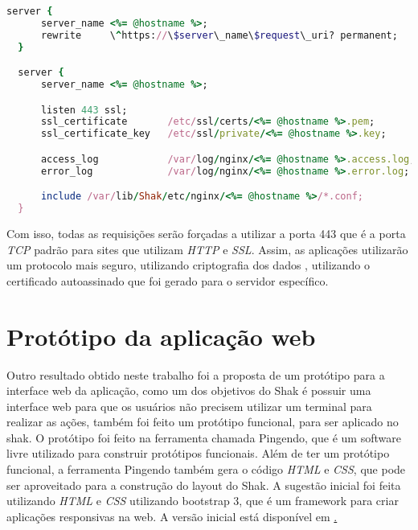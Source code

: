 \begin{lstlisting}[language=Ruby,label=dice_index,caption={Exemplo de arquivo de configuração do Nginx para aplicações web no shak}]
  server {
      server_name <%= @hostname %>;
      rewrite     \^https://\$server\_name\$request\_uri? permanent;
  }

  server {
      server_name <%= @hostname %>;

      listen 443 ssl;
      ssl_certificate       /etc/ssl/certs/<%= @hostname %>.pem;
      ssl_certificate_key   /etc/ssl/private/<%= @hostname %>.key;

      access_log            /var/log/nginx/<%= @hostname %>.access.log;
      error_log             /var/log/nginx/<%= @hostname %>.error.log;

      include /var/lib/Shak/etc/nginx/<%= @hostname %>/*.conf;
  }
\end{lstlisting}

Com isso, todas as requisições serão forçadas a utilizar a porta 443 que é a porta
\textit{TCP} padrão para sites que utilizam \textit{HTTP} e \textit{SSL}. Assim, 
as aplicações utilizarão um protocolo mais seguro, utilizando criptografia dos dados
, utilizando o certificado autoassinado que foi gerado para o servidor específico.

\section{Protótipo da aplicação web}
\label{sub:prototipo}

Outro resultado obtido neste trabalho foi a proposta de um protótipo para a interface
web da aplicação, como um dos objetivos do Shak é possuir uma interface web para que
os usuários não precisem utilizar um terminal para realizar as ações, também foi
feito um protótipo funcional, para ser aplicado no shak. O protótipo foi feito
na ferramenta chamada Pingendo, que é um software livre utilizado para construir
protótipos funcionais. Além de ter um protótipo funcional, a ferramenta Pingendo
também gera o código \textit{HTML} e \textit{CSS}, que pode ser aproveitado para 
a construção do layout do Shak. A sugestão inicial foi feita utilizando \textit{HTML} e \textit{CSS} utilizando
bootstrap 3, que é um framework para criar aplicações responsivas na web. A versão
inicial está disponível em \href{https://gitlab.com/Thiagovsk/shak_frontend/tree/master}.


